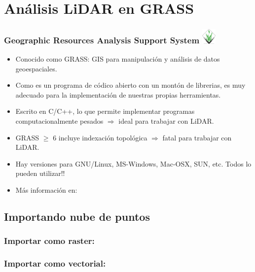\section{Análisis LiDAR en GRASS}
\begin{frame}
    \frametitle{Geographic Resources Analysis Support System\hfill
        \includegraphics[width=0.7cm]{images/grasslogo_transp_big.png}} 
     \begin{itemize}
        \item Conocido como \alert<1>{GRASS}: GIS para manipulación y
            análisis de datos geoespaciales.
        \item Como es un programa de \alert{códico abierto} con un montón de
            librerias, es muy adecuado para la implementación de nuestras
            propias herramientas.
        \item Escrito en C/C++, lo que permite implementar programas
            computacionalmente pesados $\Rightarrow$ \alert{ideal} para trabajar
            con LiDAR.
        \item GRASS $\geq$ 6 incluye indexación topológica $\Rightarrow$
            \alert{fatal} para trabajar con LiDAR.  \item Hay versiones para
            GNU/Linux, MS-Windows, Mac-OSX, SUN, etc.
            \alert{\textexclamdown\textexclamdown Todos lo pueden utilizar!!}
        \item Más información en:
    \end{itemize}
\end{frame}
\subsection{Importando nube de puntos}
\begin{frame}
 \frametitle{Importar como raster: \LARGE{}}
\end{frame}
\begin{frame}
 \frametitle{Importar como vectorial: \LARGE{}}
\end{frame}
